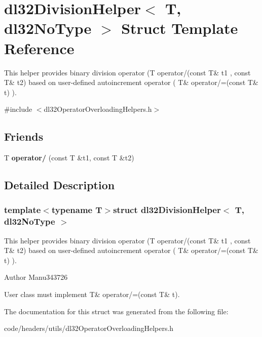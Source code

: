 \hypertarget{structdl32_division_helper_3_01_t_00_01dl32_no_type_01_4}{\section{dl32\-Division\-Helper$<$ T, dl32\-No\-Type $>$ Struct Template Reference}
\label{structdl32_division_helper_3_01_t_00_01dl32_no_type_01_4}
}


This helper provides binary division operator (T operator/(const T\& t1 , const T\& t2) based on user-\/defined autoincrement operator ( T\& operator/=(const T\& t) ).  




{\ttfamily \#include $<$dl32\-Operator\-Overloading\-Helpers.\-h$>$}

\subsection*{Friends}
\begin{DoxyCompactItemize}
\item 
\hypertarget{structdl32_division_helper_3_01_t_00_01dl32_no_type_01_4_a7787bd9c9fa1dd1e9b03ea5703d4b2c8}{T {\bfseries operator/} (const T \&t1, const T \&t2)}\label{structdl32_division_helper_3_01_t_00_01dl32_no_type_01_4_a7787bd9c9fa1dd1e9b03ea5703d4b2c8}

\end{DoxyCompactItemize}


\subsection{Detailed Description}
\subsubsection*{template$<$typename T$>$struct dl32\-Division\-Helper$<$ T, dl32\-No\-Type $>$}

This helper provides binary division operator (T operator/(const T\& t1 , const T\& t2) based on user-\/defined autoincrement operator ( T\& operator/=(const T\& t) ). 

\begin{DoxyAuthor}{Author}
Manu343726
\end{DoxyAuthor}
User class must implement T\& operator/=(const T\& t). 

The documentation for this struct was generated from the following file\-:\begin{DoxyCompactItemize}
\item 
code/headers/utils/dl32\-Operator\-Overloading\-Helpers.\-h\end{DoxyCompactItemize}
